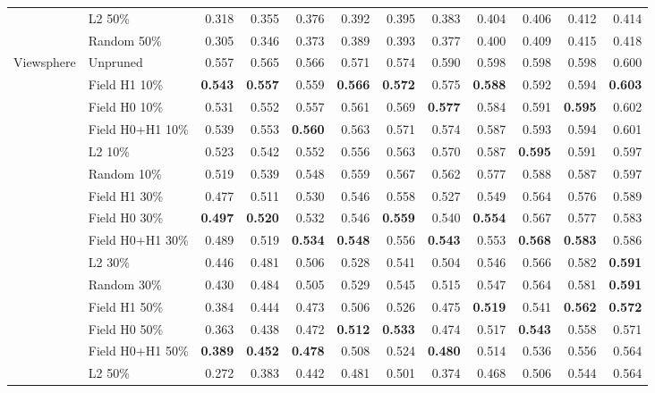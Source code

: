 \begin{tabular}{llrrrrrrrrrr}
 & L2 50\% & 0.318 & 0.355 & 0.376 & 0.392 & 0.395 & 0.383 & 0.404 & 0.406 & 0.412 & 0.414 \\
 & Random 50\% & 0.305 & 0.346 & 0.373 & 0.389 & 0.393 & 0.377 & 0.400 & 0.409 & 0.415 & 0.418 \\
\midrule
Viewsphere & Unpruned & 0.557 & 0.565 & 0.566 & 0.571 & 0.574 & 0.590 & 0.598 & 0.598 & 0.598 & 0.600 \\
 & Field H1 10\% & \textbf{0.543} & \textbf{0.557} & 0.559 & \textbf{0.566} & \textbf{0.572} & 0.575 & \textbf{0.588} & 0.592 & 0.594 & \textbf{0.603} \\
 & Field H0 10\% & 0.531 & 0.552 & 0.557 & 0.561 & 0.569 & \textbf{0.577} & 0.584 & 0.591 & \textbf{0.595} & 0.602 \\
 & Field H0+H1 10\% & 0.539 & 0.553 & \textbf{0.560} & 0.563 & 0.571 & 0.574 & 0.587 & 0.593 & 0.594 & 0.601 \\
 & L2 10\% & 0.523 & 0.542 & 0.552 & 0.556 & 0.563 & 0.570 & 0.587 & \textbf{0.595} & 0.591 & 0.597 \\
 & Random 10\% & 0.519 & 0.539 & 0.548 & 0.559 & 0.567 & 0.562 & 0.577 & 0.588 & 0.587 & 0.597 \\
\addlinespace[2pt]
 & Field H1 30\% & 0.477 & 0.511 & 0.530 & 0.546 & 0.558 & 0.527 & 0.549 & 0.564 & 0.576 & 0.589 \\
 & Field H0 30\% & \textbf{0.497} & \textbf{0.520} & 0.532 & 0.546 & \textbf{0.559} & 0.540 & \textbf{0.554} & 0.567 & 0.577 & 0.583 \\
 & Field H0+H1 30\% & 0.489 & 0.519 & \textbf{0.534} & \textbf{0.548} & 0.556 & \textbf{0.543} & 0.553 & \textbf{0.568} & \textbf{0.583} & 0.586 \\
 & L2 30\% & 0.446 & 0.481 & 0.506 & 0.528 & 0.541 & 0.504 & 0.546 & 0.566 & 0.582 & \textbf{0.591} \\
 & Random 30\% & 0.430 & 0.484 & 0.505 & 0.529 & 0.545 & 0.515 & 0.547 & 0.564 & 0.581 & \textbf{0.591} \\
\addlinespace[2pt]
 & Field H1 50\% & 0.384 & 0.444 & 0.473 & 0.506 & 0.526 & 0.475 & \textbf{0.519} & 0.541 & \textbf{0.562} & \textbf{0.572} \\
 & Field H0 50\% & 0.363 & 0.438 & 0.472 & \textbf{0.512} & \textbf{0.533} & 0.474 & 0.517 & \textbf{0.543} & 0.558 & 0.571 \\
 & Field H0+H1 50\% & \textbf{0.389} & \textbf{0.452} & \textbf{0.478} & 0.508 & 0.524 & \textbf{0.480} & 0.514 & 0.536 & 0.556 & 0.564 \\
 & L2 50\% & 0.272 & 0.383 & 0.442 & 0.481 & 0.501 & 0.374 & 0.468 & 0.506 & 0.544 & 0.564 \\

\end{tabular}
